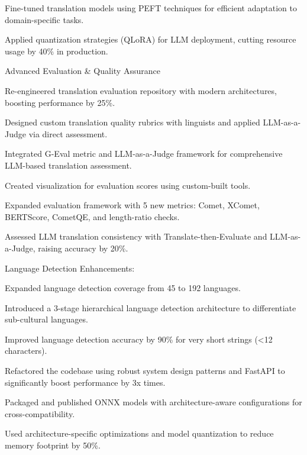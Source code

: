 \begin{cventries}
{\begin{cvitemswithheading}
        \item {Fine-tuned translation models using PEFT techniques for efficient adaptation to domain-specific tasks.}
        \item {Applied quantization strategies (QLoRA) for LLM deployment, cutting resource usage by 40\% in production.}
      \end{cvitemswithheading}
  }
  \cvexpproj
  {
    \begin{cvitemswithheading}
        {Advanced Evaluation \& Quality Assurance}
        \item {Re-engineered translation evaluation repository with modern architectures, boosting performance by 25\%.}
        \item {Designed custom translation quality rubrics with linguists and applied LLM-as-a-Judge via direct assessment.}
        \item {Integrated G-Eval metric and LLM-as-a-Judge framework for comprehensive LLM-based translation assessment.}
        \item {Created visualization for evaluation scores using custom-built tools.}
        \item {Expanded evaluation framework with 5 new metrics: Comet, XComet, BERTScore, CometQE, and length-ratio checks.}
        \item {Assessed LLM translation consistency with Translate-then-Evaluate and LLM-as-a-Judge, raising accuracy by 20\%.}
    \end{cvitemswithheading}
  }
  \cvexpproj
  {
    \begin{cvitemswithheading}
        {Language Detection Enhancements:}
        \item {Expanded language detection coverage from 45 to 192 languages.}
        \item {Introduced a 3-stage hierarchical language detection architecture to differentiate sub-cultural languages.}
        \item {Improved language detection accuracy by 90\% for very short strings (<12 characters).}
        \item {Refactored the codebase using robust system design patterns and FastAPI to significantly boost performance by 3x times.}
        \item {Packaged and published ONNX models with architecture-aware configurations for cross-compatibility.}
        \item {Used architecture-specific optimizations and model quantization to reduce memory footprint by 50\%.}
      \end{cvitemswithheading}
}
\end{cventries}
